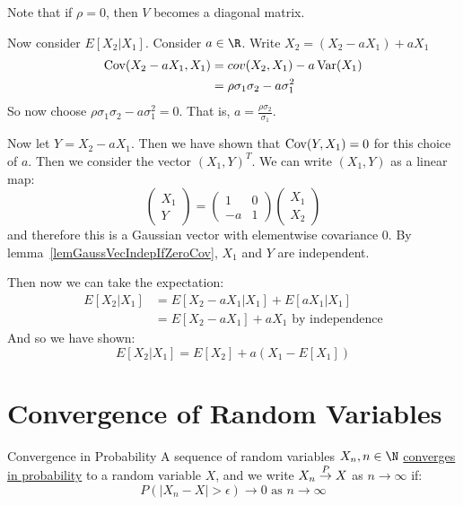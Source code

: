 \documentclass[../Main.tex]{subfiles}
\begin{document}
\begin{example}
    Note that if $\rho = 0$, then $V$ becomes a diagonal matrix.

    Now consider $E[X_2 | X_1]$. Consider $a \in \R$. Write $X_2 = (X_2 - a X_1) + aX_1$
    \begin{align*}
        \operatorname{Cov}(X_2 - aX_1, X_1) &= cov(X_2, X_1) - a\operatorname{Var}(X_1) \\
        &= \rho \sigma_1 \sigma_2 - a\sigma_1^2
    \end{align*}
    So now choose $\rho \sigma_1 \sigma_2 - a\sigma_1^2 = 0$. That is, $a = \frac{\rho \sigma_2}{\sigma_1}$.

    Now let $Y = X_2 - aX_1$. Then we have shown that $\operatorname{Cov}(Y, X_1) = 0$ for this choice of $a$. Then we consider the vector $(X_1, Y)^T$.
    We can write $(X_1, Y)$ as a linear map:
    \begin{equation*}
        \begin{pmatrix}X_1 \\ Y\end{pmatrix} = \begin{pmatrix}1 & 0 \\ -a & 1\end{pmatrix}\begin{pmatrix}X_1 \\ X_2\end{pmatrix}
    \end{equation*}
    and therefore this is a Gaussian vector with elementwise covariance 0. By lemma~\ref{lemGaussVecIndepIfZeroCov}, $X_1$ and $Y$ are independent.

    Then now we can take the expectation:
    \begin{align*}
        E[X_2 | X_1] &= E[X_2 - aX_1 | X_1] + E[aX_1 | X_1] \\
        &= E[X_2 - aX_1] + aX_1 \text{ by independence}
    \end{align*}
    And so we have shown:
    \begin{equation}
        E[X_2 | X_1] = E[X_2] + a(X_1 - E[X_1])
        \label{eqnCondExpecGaussVars}
    \end{equation}
\end{example}
\section{Convergence of Random Variables}
\begin{definition}{Convergence in Probability}
    A sequence of random variables $X_n, n \in \N$ \underline{converges in probability} to a random variable $X$, and we write $X_n \overset{P}{\rightarrow} X$ as $n \to \infty$ if:
    \begin{equation*}
        P(|X_n - X| > \epsilon) \to 0 \text{ as } n \to \infty
    \end{equation*}
\end{definition}
\end{document}
